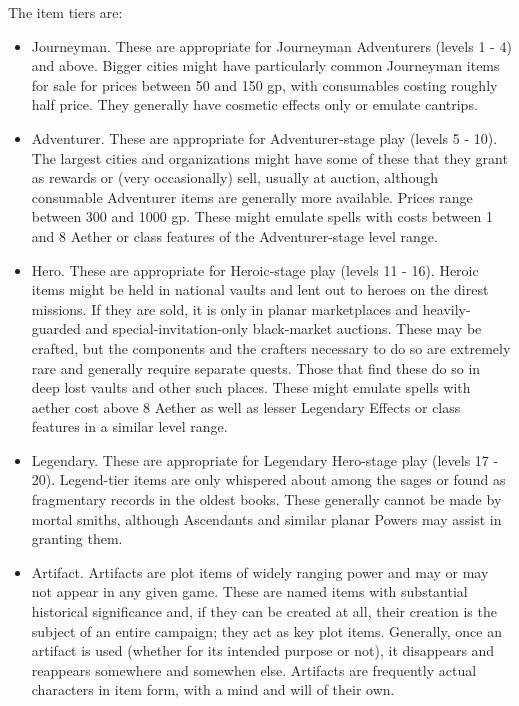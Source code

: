 The item tiers are:
\begin{itemize}
	\item Journeyman. These are appropriate for Journeyman Adventurers (levels 1 - 4) and above. Bigger cities might have particularly common Journeyman items for sale for prices between 50 and 150 gp, with consumables costing roughly half price. They generally have cosmetic effects only or emulate cantrips.
	\item Adventurer. These are appropriate for Adventurer-stage play (levels 5 - 10). The largest cities and organizations might have some of these that they grant as rewards or (very occasionally) sell, usually at auction, although consumable Adventurer  items are generally more available. Prices range between 300 and 1000 gp. These might emulate spells with costs between 1 and 8 Aether or class features of the Adventurer-stage level range.
	\item Hero. These are appropriate for Heroic-stage play (levels 11 - 16). Heroic items might be held in national vaults and lent out to heroes on the direst missions. If they are sold, it is only in planar marketplaces and heavily-guarded and special-invitation-only black-market auctions. These may be crafted, but the components and the crafters necessary to do so are extremely rare and generally require separate quests. Those that find these do so in deep lost vaults and other such places. These might emulate spells with aether cost above 8 Aether as well as lesser Legendary Effects or class features in a similar level range.
	\item Legendary. These are appropriate for Legendary Hero-stage play (levels 17 - 20). Legend-tier items are only whispered about among the sages or found as fragmentary records in the oldest books. These generally cannot be made by mortal smiths, although Ascendants and similar planar Powers may assist in granting them.
	\item Artifact. Artifacts are plot items of widely ranging power and may or may not appear in any given game. These are named items with substantial historical significance and, if they can be created at all, their creation is the subject of an entire campaign; they act as key plot items. Generally, once an artifact is used (whether for its intended purpose or not), it disappears and reappears somewhere and somewhen else. Artifacts are frequently actual characters in item form, with a mind and will of their own.
\end{itemize}

